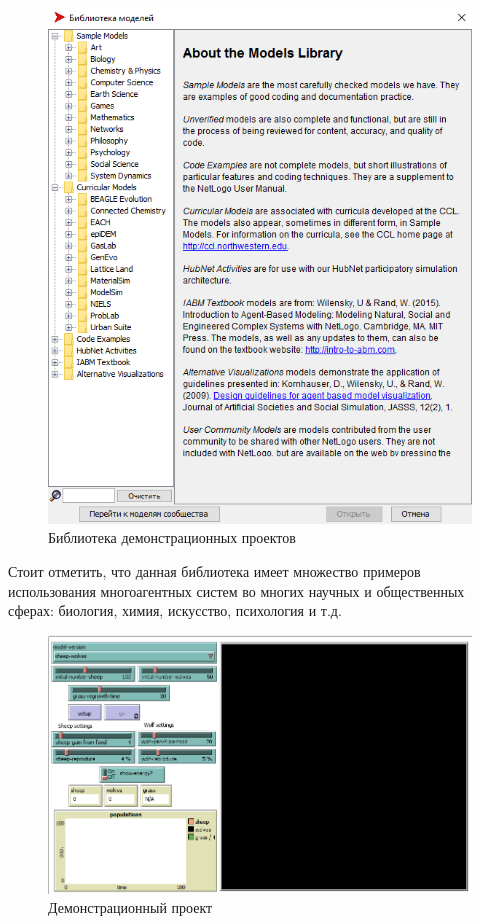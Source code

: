 \documentclass[14pt,a4paper,report]{report}
\begin{document}
\begin{figure}[h!]
	\centering
	\includegraphics[scale = 0.60]{images/2.png}
	\caption{Библиотека демонстрационных проектов}
\end{figure}

Стоит отметить, что данная библиотека имеет множество примеров использования многоагентных систем во многих научных и общественных сферах: биология, химия, искусство, психология и т.д.

\begin{figure}[h!]
	\centering
	\includegraphics[scale = 0.60]{images/3.png}
	\caption{Демонстрационный проект}
\end{figure}
\end{document}
